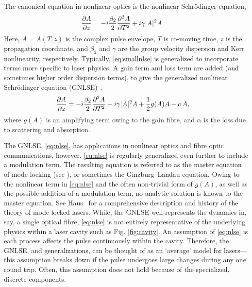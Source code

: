 \documentclass[9pt,twocolumn,twoside]{osajnl}
\newcommand{\pdiff}[3][\hspace{-0.5pt}]{\frac{\partial^{#1}#2}{\partial{#3}^{#1}}} %
\begin{document}
The canonical equation in nonlinear optics is the nonlinear Schr\"odinger equation,
\begin{align}
	\pdiff{A}{z} &= - i \frac{\beta_2}{2}\pdiff[2]{A}{T} + i \gamma |A|^2 A.
	\label{eq:smallnlse}
\end{align}
Here, $A = A(T, z)$ is the complex pulse envelope, $T$ is co-moving time, $z$ is the propagation coordinate, and $\beta_2$ and $\gamma$ are the group velocity dispersion and Kerr nonlinearity, respectively. Typically, \eqref{eq:smallnlse} is generalized to incorporate terms more specific to laser physics. A gain term and loss term are added (and sometimes higher order dispersion terms), to give the generalized nonlinear Schr\"odinger equation (GNLSE)~\cite{agrawal2013, bohun2015, finot2008, peng2018, shtyrina2017, yarutkina2013},
	\begin{align}
	\pdiff{A}{z} &= - i \frac{\beta_2}{2}\pdiff[2]{A}{T} + i \gamma |A|^2 A + \frac{1}{2}g(A) A - \alpha A,
	\label{eq:nlse}
\end{align}
where $g(A)$ is an amplifying term owing to the gain fibre, and $\alpha$ is the loss due to scattering and absorption.

The GNLSE, \eqref{eq:nlse}, has applications in nonlinear optics and fibre optic communications, however, \eqref{eq:nlse} is regularly generalized even further to include a modulation term. The resulting equation is referred to as the master equation of mode-locking (see \cite{haus1975, haus1984, haus2000, tamura1996, usechak2005}), or sometimes the Ginzburg--Landau equation. Owing to the nonlinear term in \eqref{eq:nlse} and the often non-trivial form of $g(A)$, as well as the possible addition of a modulation term, no analytic solution is known to the master equation. See Haus~\cite{haus2000} for a comprehensive description and history of the theory of mode-locked lasers. While, the GNLSE well represents the dynamics in, say, a single optical fibre, \eqref{eq:nlse} is not entirely representative of the underlying physics within a laser cavity such as Fig. \ref{fig:cavity}. An assumption of \eqref{eq:nlse} is each process affects the pulse continuously within the cavity. Therefore, the GNLSE, and generalizations, can be thought of as an `average' model for lasers---this assumption breaks down if the pulse undergoes large changes during any one round trip. Often, this assumption does not hold because of the specialized, discrete components.
\end{document}
